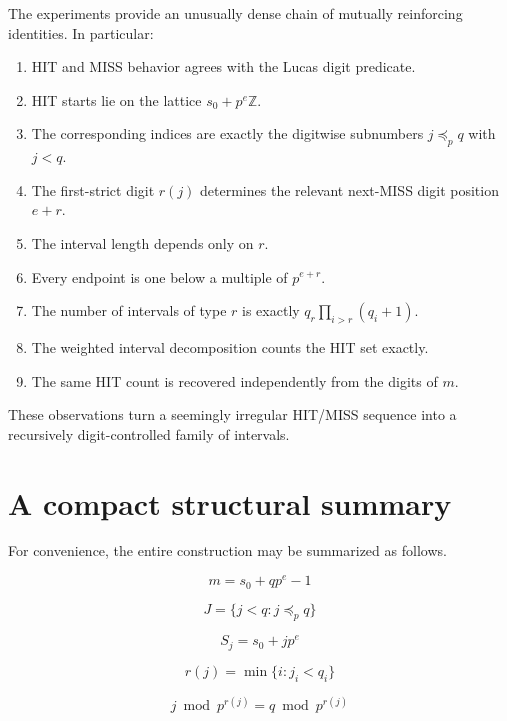 \documentclass[11pt,a4paper]{article}
\theoremstyle{definition}
\theoremstyle{remark}
\begin{document}
The experiments provide an unusually dense chain of mutually reinforcing identities.  In particular:
\begin{enumerate}[label=\arabic*.]
  \item HIT and MISS behavior agrees with the Lucas digit predicate.
  \item HIT starts lie on the lattice $s_0+p^e\mathbb{Z}$.
  \item The corresponding indices are exactly the digitwise subnumbers $j\preceq_p q$ with $j<q$.
  \item The first-strict digit $r(j)$ determines the relevant next-MISS digit position $e+r$.
  \item The interval length depends only on $r$.
  \item Every endpoint is one below a multiple of $p^{e+r}$.
  \item The number of intervals of type $r$ is exactly $q_r\prod_{i>r}(q_i+1)$.
  \item The weighted interval decomposition counts the HIT set exactly.
  \item The same HIT count is recovered independently from the digits of $m$.
\end{enumerate}

These observations turn a seemingly irregular HIT/MISS sequence into a recursively digit-controlled family of intervals.

\section{A compact structural summary}

For convenience, the entire construction may be summarized as follows.

\begin{equation}
\boxed{
 m=s_0+qp^e-1
}
\end{equation}

\begin{equation}
\boxed{
 J=\{j<q:j\preceq_p q\}
}
\end{equation}

\begin{equation}
\boxed{
 S_j=s_0+jp^e
}
\end{equation}

\begin{equation}
\boxed{
 r(j)=\min\{i:j_i<q_i\}
}
\end{equation}

\begin{equation}
\boxed{
 j\bmod p^{r(j)}=q\bmod p^{r(j)}
}
\end{equation}
\end{document}
